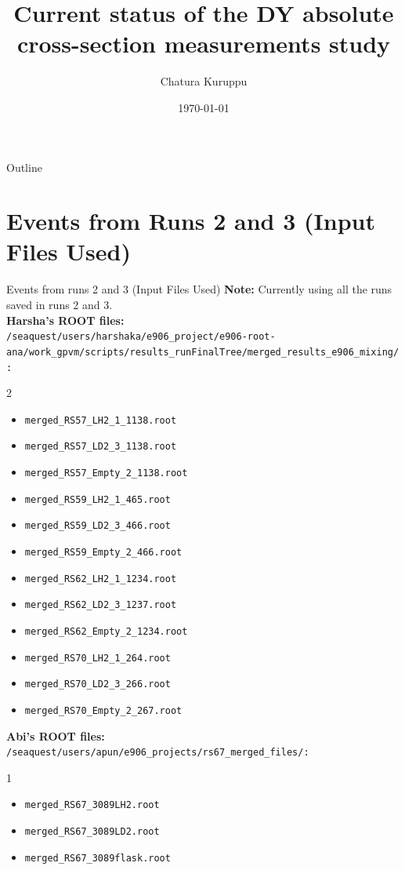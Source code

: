\documentclass[aspectratio=169, 10pt]{beamer}
\title[DY Absolute Cross-Section]{Current status of the DY absolute cross-section measurements study}
\author[C. Kuruppu]{Chatura Kuruppu}
\institute[NMSU]{New Mexico State University}
\date{\today}
\begin{document}
\begin{frame}
    \titlepage
\end{frame}

\begin{frame}{Outline}
    \tableofcontents[hideallsubsections]
\end{frame}

\section{Events from Runs 2 and 3 (Input Files Used)}

\begin{frame}{Events from runs 2 and 3 (Input Files Used)}
\textbf{Note:} Currently using all the runs saved in runs 2 and 3.
\vspace{0.3cm}
\tiny\\
\textbf{Harsha's ROOT files:} \\
\texttt{/seaquest/users/harshaka/e906\_project/e906-root-ana/work\_gpvm/scripts/results\_runFinalTree/merged\_results\_e906\_mixing/:}
\begin{multicols}{2}
\begin{itemize}
    \item \texttt{merged\_RS57\_LH2\_1\_1138.root}
    \item \texttt{merged\_RS57\_LD2\_3\_1138.root}
    \item \texttt{merged\_RS57\_Empty\_2\_1138.root}
    \item \texttt{merged\_RS59\_LH2\_1\_465.root}
    \item \texttt{merged\_RS59\_LD2\_3\_466.root}
    \item \texttt{merged\_RS59\_Empty\_2\_466.root}
    \item \texttt{merged\_RS62\_LH2\_1\_1234.root}
    \item \texttt{merged\_RS62\_LD2\_3\_1237.root}
    \item \texttt{merged\_RS62\_Empty\_2\_1234.root}
    \item \texttt{merged\_RS70\_LH2\_1\_264.root}
    \item \texttt{merged\_RS70\_LD2\_3\_266.root}
    \item \texttt{merged\_RS70\_Empty\_2\_267.root}
\end{itemize}
\end{multicols}
\textbf{Abi's ROOT files:} \\
\texttt{/seaquest/users/apun/e906\_projects/rs67\_merged\_files/:}
\begin{multicols}{1}
\begin{itemize}
    \item \texttt{merged\_RS67\_3089LH2.root}
    \item \texttt{merged\_RS67\_3089LD2.root}
    \item \texttt{merged\_RS67\_3089flask.root}
\end{itemize}
\end{multicols}

\normalsize
\end{frame}
\end{document}
